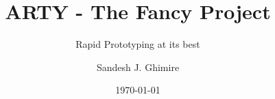 \title{ARTY - The Fancy Project}
\subtitle{Rapid Prototyping at its best }
\date{\today}
\author{Sandesh J. Ghimire}
